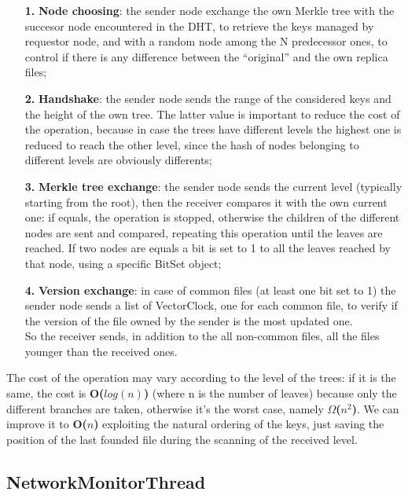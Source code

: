 \documentclass[12pt, a4paper, oneside] {book}
\begin{document}
\begin{itemize}
  \item [\textbf{1.}] \textbf{Node choosing}: the sender node exchange the own Merkle tree with the succesor node encountered in the DHT, to retrieve the keys managed by requestor node,
					      and with a random node among the N predecessor ones, to control if there is any difference between the ``original'' and the own replica files;
  \item [\textbf{2.}] \textbf{Handshake}: the sender node sends the range of the considered keys and the height of the own tree. The latter value is important to reduce the cost of the operation,
					  because in case the trees have different levels the highest one is reduced to reach the other level, since the hash of nodes belonging to different levels are
					  obviously differents;
  \item [\textbf{3.}] \textbf{Merkle tree exchange}: the sender node sends the current level (typically starting from the root), then the receiver compares it with the own current one:
						     if equals, the operation is stopped, otherwise the children of the different nodes are sent and compared,
						     repeating this operation until the leaves are reached.
						     If two nodes are equals a bit is set to 1 to all the leaves reached by that node, using a specific BitSet object;
  \item [\textbf{4.}] \textbf{Version exchange}: in case of common files (at least one bit set to 1) the sender node sends a list of VectorClock, one for each common file,
						 to verify if the version of the file owned by the sender is the most updated one.\\
						 So the receiver sends, in addition to the all non-common files, all the files younger than the received ones.
\end{itemize}

The cost of the operation may vary according to the level of the trees: if it is the same, the cost is \textbf{O($log(n)$)} (where n is the number of leaves) because only the different branches are taken,
otherwise it's the worst case, namely \textbf{$\Omega$($n^2$)}.
We can improve it to \textbf{O($n$)} exploiting the natural ordering of the keys, just saving the position of the last founded file during the scanning of the received level.

\subsection{NetworkMonitorThread}
\end{document}
